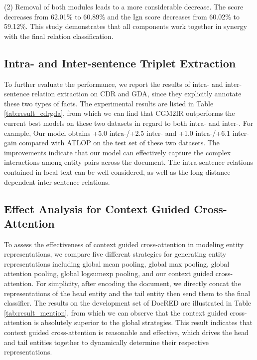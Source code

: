 \documentclass[11pt]{article}
\begin{document}
(2) Removal of both modules leads to a more considerable decrease.
The  score decreases from 62.01\% to 60.89\% and the Ign  score decreases from 60.02\% to 59.12\%.
This study demonstrates that all components work together in synergy with the final relation classification. 

\subsection{Intra- and Inter-sentence Triplet Extraction}
To further evaluate the performance, we report the results of intra- and inter-sentence relation extraction on CDR and GDA, since they explicitly annotate these two types of facts.
The experimental results are listed in Table \ref{tab:result_cdrgda}, from which we can find that CGM2IR outperforms the current best models on these two datasets in regard to both intra- and inter-.
For example, Our model obtains +5.0 intra-/+2.5 inter- and +1.0 intra-/+6.1 inter- gain compared with ATLOP on the test set of these two datasets. 
The improvements indicate that our model can effectively capture the complex interactions among entity pairs across the document.
The intra-sentence relations contained in local text can be well considered, as well as the long-distance dependent inter-sentence relations.


\subsection{Effect Analysis for Context Guided Cross-Attention}

To assess the effectiveness of context guided cross-attention in modeling entity representations, we compare five different strategies for generating entity representations including global mean pooling, global max pooling, global attention pooling, global logsumexp pooling, and our context guided cross-attention.
For simplicity, after encoding the document, we directly concat the representations of the head entity and the tail entity then send them to the final classifier.
The results on the development set of DocRED are illustrated in Table \ref{tab:result_mention}, from which we can observe that the context guided cross-attention is absolutely superior to the global strategies.
This result indicates that context guided cross-attention is reasonable and effective, which drives the head and tail entities together to dynamically determine their respective representations.
\end{document}
